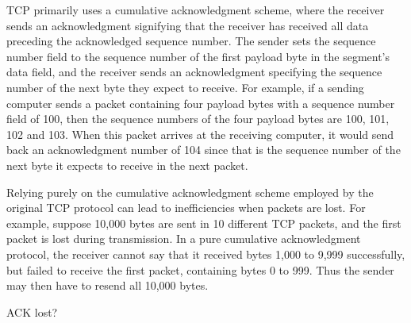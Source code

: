    TCP primarily uses a
  cumulative acknowledgment scheme, where the receiver sends an acknowledgment signifying
  that the receiver has received all data preceding the acknowledged sequence number. The
  sender sets the sequence number field to the sequence number of the first payload byte
  in the segment's data field, and the receiver sends an acknowledgment specifying the
  sequence number of the next byte they expect to receive. For example, if a sending
  computer sends a packet containing four payload bytes with a sequence number field of
  100, then the sequence numbers of the four payload bytes are 100, 101, 102 and 103. When
  this packet arrives at the receiving computer, it would send back an acknowledgment
  number of 104 since that is the sequence number of the next byte it expects to receive
  in the next packet.

  Relying purely on the cumulative acknowledgment scheme employed by the original TCP
  protocol can lead to inefficiencies when packets are lost. For example, suppose 10,000
  bytes are sent in 10 different TCP packets, and the first packet is lost during
  transmission. In a pure cumulative acknowledgment protocol, the receiver cannot say that
  it received bytes 1,000 to 9,999 successfully, but failed to receive the first packet,
  containing bytes 0 to 999. Thus the sender may then have to resend all 10,000
  bytes. 


\begin{frame}
  \begin{block}{ACK lost?}
    \begin{center}
    \end{center}
  \end{block}
\end{frame}

